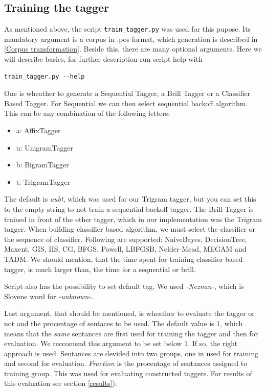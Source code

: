 \documentclass[11pt, conference, compsocconf]{IEEEtran}
\begin{document}
\subsection{Training the tagger} %
As mentioned above, the script \texttt{train\_tagger.py} was used for this pupose. Its mandatory argument is a corpus in .pos format, which generation is described in \ref{Corpus transformation}. Beside this, there are many optional arguments. Here we will describe basics, for further description run script help with
\begin{lstlisting}
train_tagger.py --help
\end{lstlisting}
\par
One is wheather to generate a Sequential Tagger, a Brill Tagger or a Classifier Based Tagger. For Sequential we can then select sequential backoff algorithm. This can be any combination of the following letters:
\begin{itemize}
\item a: AffixTagger
\item u: UnigramTagger
\item b: BigramTagger
\item t: TrigramTagger
\end{itemize}
The default is \textit{aubt}, which was used for our Trigram tagger, but you can set this to the empty string to not train a sequential backoff tagger. The Brill Tagger is trained in front of the other tagger, which in our implementation was the Trigram tagger. When building classifier based algorithm, we must select the classifier or the sequence of classifier. Following are supported: NaiveBayes, DecisionTree, Maxent, GIS, IIS, CG, BFGS, Powell, LBFGSB, Nelder-Mead, MEGAM and TADM. We should mention, that the time spent for training classifier based tagger, is much larger than, the time for a sequential or brill.
\par
Script also has the possibility to set default tag. We used \textit{-Neznan-}, which is Slovene word for \textit{-unknown-}.
\par
Last argument, that should be mentioned, is wheather to evaluate the tagger or not and the procentage of sentaces to be used. The default value is 1, which means that the \textit{same} sentances are first used for training the tagger and then for evaluation. We reccomend this argument to be set below 1. If so, the right approach is used.
Sentances are devided into two groups, one in used for training and second for evaluation. \textit{Fraction} is the procentage of sentances assigned to training group. 
This was used for evaluating constructed taggers. For results of this evaluation see section \ref{results}).
\end{document}
